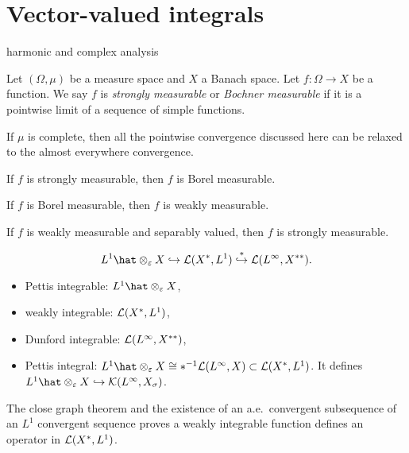 \documentclass{../../large}
\begin{document}
\section{Vector-valued integrals}


harmonic and complex analysis


\begin{prb}
Let $(\Omega,\mu)$ be a measure space and $X$ a Banach space.
Let $f:\Omega\to X$ be a function.
We say $f$ is \emph{strongly measurable} or \emph{Bochner measurable} if it is a pointwise limit of a sequence of simple functions.

If $\mu$ is complete, then all the pointwise convergence discussed here can be relaxed to the almost everywhere convergence.
\begin{parts}
\item If $f$ is strongly measurable, then $f$ is Borel measurable.
\item If $f$ is Borel measurable, then $f$ is weakly measurable.
\item If $f$ is weakly measurable and separably valued, then $f$ is strongly measurable.
\end{parts}
\end{prb}

\begin{prb}
\[L^1\hat\otimes_\e X\hookrightarrow\cL(X^*,L^1)\stackrel{*}{\hookrightarrow}\cL(L^\infty,X^{**}).\]
\begin{itemize}
\item Pettis integrable: $L^1\hat\otimes_\e X$,
\item weakly integrable: $\mathcal{L}(X^*,L^1)$,
\item Dunford integrable: $\mathcal{L}(L^\infty,X^{**})$,
\item Pettis integral: $L^1\hat\otimes_\e X\cong *^{-1}\cL(L^\infty,X)\subset\cL(X^*,L^1)$. It defines $L^1\hat\otimes_\e X\hookrightarrow\cK(L^\infty,X_\sigma)$.
\end{itemize}

\begin{parts}
\item The close graph theorem and the existence of an a.e.~convergent subsequence of an $L^1$ convergent sequence proves a weakly integrable function defines an operator in $\mathcal{L}(X^*,L^1)$.
\end{parts}
\end{prb}
\end{document}
